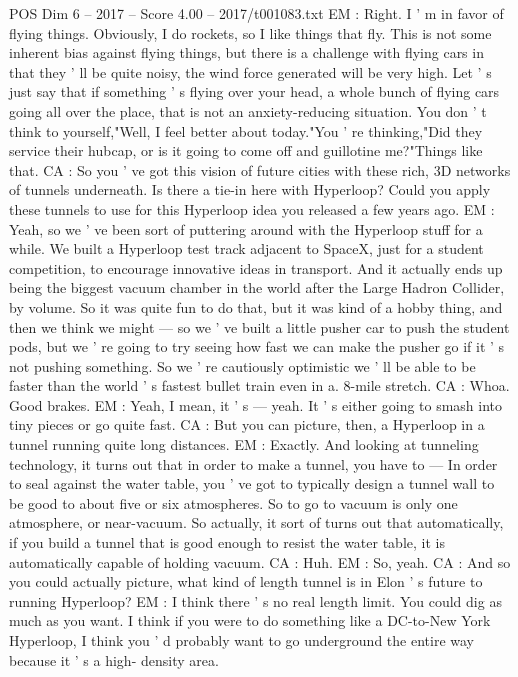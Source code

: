 \begin{textsample}{POS Dim 6 – 2017 – Score 4.00 – 2017/t001083.txt}
EM : Right.
I ' m in favor of flying things.
Obviously, I do rockets, so I like things that fly.
This is not some inherent bias against flying things, but there is a challenge with flying cars in that they ' ll be quite noisy, the wind force generated will be very high.
Let ' s just say that if something ' s flying over your head, a whole bunch of flying cars going all over the place, that is not an anxiety-reducing situation.
You don ' t think to yourself,"Well, I feel better about today."You ' re thinking,"Did they service their hubcap, or is it going to come off and guillotine me?"Things like that.
CA : So you ' ve got this vision of future cities with these rich, 3D networks of tunnels underneath.
Is there a tie-in here with Hyperloop?
Could you apply these tunnels to use for this Hyperloop idea you released a few years ago.
EM : Yeah, so we ' ve been sort of puttering around with the Hyperloop stuff for a while.
We built a Hyperloop test track adjacent to SpaceX, just for a student competition, to encourage innovative ideas in transport.
And it actually ends up being the biggest vacuum chamber in the world after the Large Hadron Collider, by volume.
So it was quite fun to do that, but it was kind of a hobby thing, and then we think we might — so we ' ve built a little pusher car to push the student pods, but we ' re going to try seeing how fast we can make the pusher go if it ' s not pushing something.
So we ' re cautiously optimistic we ' ll be able to be faster than the world ' s fastest bullet train even in a. 8-mile stretch.
CA : Whoa.
Good brakes.
EM : Yeah, I mean, it ' s — yeah.
It ' s either going to smash into tiny pieces or go quite fast.
CA : But you can picture, then, a Hyperloop in a tunnel running quite long distances.
EM : Exactly.
And looking at tunneling technology, it turns out that in order to make a tunnel, you have to — In order to seal against the water table, you ' ve got to typically design a tunnel wall to be good to about five or six atmospheres.
So to go to vacuum is only one atmosphere, or near-vacuum.
So actually, it sort of turns out that automatically, if you build a tunnel that is good enough to resist the water table, it is automatically capable of holding vacuum.
CA : Huh.
EM : So, yeah.
CA : And so you could actually picture, what kind of length tunnel is in Elon ' s future to running Hyperloop?
EM : I think there ' s no real length limit.
You could dig as much as you want.
I think if you were to do something like a DC-to-New York Hyperloop, I think you ' d probably want to go underground the entire way because it ' s a high- density area.

\end{textsample}

